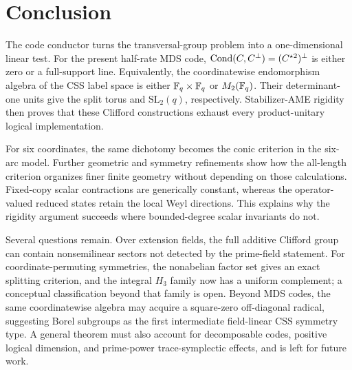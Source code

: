 \section{Conclusion}

The code conductor turns the transversal-group problem into a
one-dimensional linear test.  For the present half-rate MDS code,
\(\operatorname{Cond}(C,C^\perp)=(C^{\star2})^\perp\) is either zero or a full-support line.
Equivalently, the coordinatewise endomorphism algebra of the CSS label space
is either \(\mathbb F_q\times\mathbb F_q\) or \(M_2(\mathbb F_q)\).  Their determinant-one units
give the split torus and \(\mathrm{SL}_2(q)\), respectively.  Stabilizer-AME
rigidity then proves that these Clifford constructions exhaust every
product-unitary logical implementation.

For six coordinates, the same dichotomy becomes the conic criterion in the
six-arc model.  Further geometric and symmetry refinements show how the
all-length criterion organizes finer finite geometry without depending on
those calculations.  Fixed-copy scalar
contractions are generically constant, whereas the operator-valued reduced
states retain the local Weyl directions.  This explains why the rigidity
argument succeeds where bounded-degree scalar invariants do not.

Several questions remain.  Over extension fields, the full additive
Clifford group can contain nonsemilinear sectors not detected by the prime-field
statement.  For coordinate-permuting symmetries, the nonabelian factor set gives an
exact splitting criterion, and the integral \(H_3\) family now has a uniform
complement; a conceptual classification beyond that family is open.  Beyond
MDS codes, the same coordinatewise algebra may
acquire a square-zero off-diagonal radical, suggesting Borel subgroups as the
first intermediate field-linear CSS symmetry type.  A general theorem must
also account for decomposable codes, positive logical dimension, and
prime-power trace-symplectic effects, and is left for future work.

